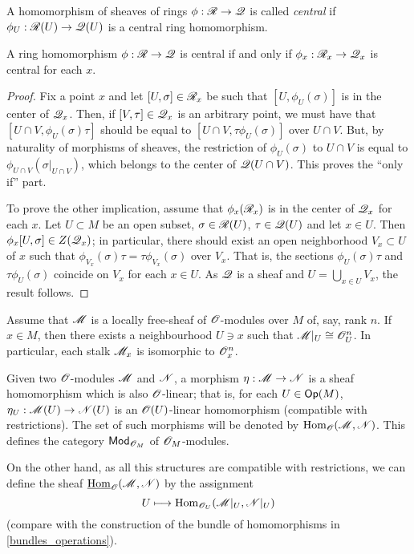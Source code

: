 A homomorphism of sheaves of rings $\phi :\mathscr{R}\to \mathscr{Q}$ is called \emph{central} if $\phi_U:\mathscr{R}(U)\to \mathscr{Q}(U)$ is a central ring homomorphism.

\begin{proposition}\label{central_stalks}
A ring homomorphism $\phi :\mathscr{R}\to \mathscr{Q}$ is central if and only if $\phi_x:\mathscr{R}_x\to \mathscr{Q}_x$ is central for each $x$.
\end{proposition}
\begin{proof}
Fix a point $x$ and let $[U,\sigma ]\in \mathscr{R}_x$ be such that $[U,\phi_U(\sigma )]$ is in the center of $\mathscr{Q}_x$. Then, if $[V,\tau ]\in \mathscr{Q}_x$ is an arbitrary point, we must have that $[U\cap V,\phi_U(\sigma )\tau ]$ should be equal to $[U\cap V,\tau \phi_U(\sigma )]$ over $U\cap V$. But, by naturality of morphisms of sheaves, the restriction of $\phi_U(\sigma )$ to $U\cap V$ is equal to $\phi_{U\cap V}(\sigma |_{U\cap V})$, which belongs to the center of $\mathscr{Q}(U\cap V)$. This proves the ``only if'' part.

To prove the other implication, assume that $\phi_x(\mathscr{R}_x)$ is in the center of $\mathscr{Q}_x$ for each $x$. Let $U\subset M$ be an open subset, $\sigma \in \mathscr{R}(U)$, $\tau \in \mathscr{Q}(U)$ and let $x\in U$. Then $\phi_x[U,\sigma ]\in Z(\mathscr{Q}_x)$; in particular, there should exist an open neighborhood $V_x\subset U$ of $x$ such that $\phi_{V_x}(\sigma )\tau = \tau \phi_{V_x}(\sigma )$ over $V_x$. That is, the sections $\phi_U(\sigma )\tau$ and $\tau \phi_U(\sigma )$ coincide on $V_x$ for each $x\in U$. As $\mathscr{Q}$ is a sheaf and $U=\bigcup_{x\in U}V_x$, the result follows.
\end{proof}

Assume that $\mathscr{M}$ is a locally free-sheaf of $\mathscr{O}$-modules over $M$ of, say, rank $n$. If $x\in M$, then there exists a neighbourhood $U\ni x$ such that $\mathscr{M}|_U\cong \mathscr{O}^n_U$. In particular, each stalk $\mathscr{M}_x$ is isomorphic to $\mathscr{O}_x^n$. 

Given two $\mathscr{O}$-modules $\mathscr{M}$ and $\mathscr{N}$, a morphism $\eta :\mathscr{M}\to \mathscr{N}$ is a sheaf homomorphism which is also $\mathscr{O}$-linear; that is, for each $U\in \mathsf{Op}(M)$, $\eta_U:\mathscr{M}(U)\to \mathscr{N}(U)$ is an $\mathscr{O}(U)$-linear homomorphism (compatible with restrictions). The set of such morphisms will be denoted by $\operatorname{Hom}_\mathscr{O}(\mathscr{M},\mathscr{N})$. This defines the category $\mathsf{Mod}_{\mathscr{O}_M}$ of $\mathscr{O}_M$-modules.

On the other hand, as all this structures are compatible with restrictions, we can define the sheaf $\underline{\operatorname{Hom}}_\mathscr{O}(\mathscr{M},\mathscr{N})$ by the assignment
$$U\longmapsto \operatorname{Hom}_{\mathscr{O}_U}(\mathscr{M}|_U,\mathscr{N}|_U)$$
(compare with the construction of the bundle of homomorphisms in \ref{bundles_operations}).

